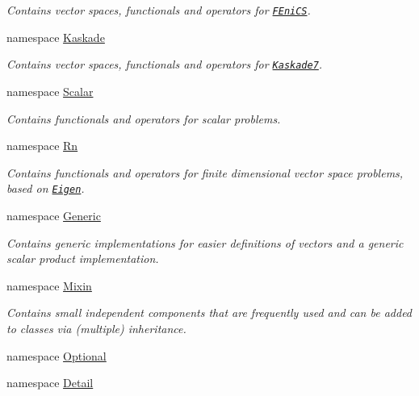 \begin{DoxyCompactItemize}
\begin{DoxyCompactList}\small\item\em \-Contains vector spaces, functionals and operators for \href{www.fenicsproject.org}{\tt \-F\-Eni\-C\-S}. \end{DoxyCompactList}\item 
namespace \hyperlink{namespaceSpacy_1_1Kaskade}{\-Kaskade}
\begin{DoxyCompactList}\small\item\em \-Contains vector spaces, functionals and operators for \href{http://www.zib.de/projects/kaskade7-finite-element-toolbox}{\tt \-Kaskade7}. \end{DoxyCompactList}\item 
namespace \hyperlink{namespaceSpacy_1_1Scalar}{\-Scalar}
\begin{DoxyCompactList}\small\item\em \-Contains functionals and operators for scalar problems. \end{DoxyCompactList}\item 
namespace \hyperlink{namespaceSpacy_1_1Rn}{\-Rn}
\begin{DoxyCompactList}\small\item\em \-Contains functionals and operators for finite dimensional vector space problems, based on \href{http://eigen.tuxfamily.org}{\tt \-Eigen}. \end{DoxyCompactList}\item 
namespace \hyperlink{namespaceSpacy_1_1Generic}{\-Generic}
\begin{DoxyCompactList}\small\item\em \-Contains generic implementations for easier definitions of vectors and a generic scalar product implementation. \end{DoxyCompactList}\item 
namespace \hyperlink{namespaceSpacy_1_1Mixin}{\-Mixin}
\begin{DoxyCompactList}\small\item\em \-Contains small independent components that are frequently used and can be added to classes via (multiple) inheritance. \end{DoxyCompactList}\item 
namespace \hyperlink{namespaceSpacy_1_1Optional}{\-Optional}
\item 
namespace \hyperlink{namespaceSpacy_1_1Detail}{\-Detail}
\end{DoxyCompactItemize}
